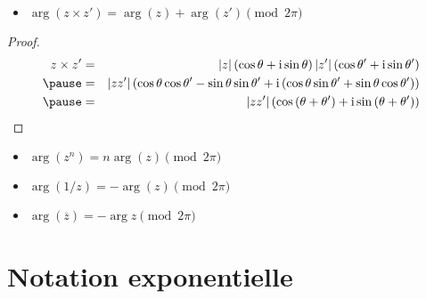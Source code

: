 \begin{frame}

  \begin{itemize}
    \item $\arg \left( z \times z' \right) = \arg (z) + \arg \left(
    z' \right) \pmod {2\pi}$
   \end{itemize}

\pause

\begin{proof}
  \begin{eqnarray*}
    z \times z' & = & \left| z \right|  \left( \cos \theta + \ii  \sin \theta \right) 
    \left| z' \right|  \left( \cos \theta' + \ii  \sin \theta' \right)\\
\pause
    & = & \left| zz' \right|  \left( \cos \theta \cos \theta' - \sin \theta
    \sin \theta' + \ii  \left( \cos \theta \sin \theta' + \sin \theta \cos
    \theta' \right) \right)\\
\pause
    & = & \left| zz' \right|  \left( \cos \left( \theta + \theta' \right) + \ii 
    \sin \left( \theta + \theta' \right) \right)
  \end{eqnarray*}
\end{proof}

     \begin{itemize}
\pause
    \item $\arg \left( z^n \right) = n \arg (z) \pmod {2\pi}$

\pause    
    \item $\arg \left( 1 / z \right) = - \arg (z) \pmod {2\pi}$

\pause    
    \item $\arg (\overline{z}) = - \arg z \pmod{2 \pi}$
  \end{itemize}



\end{frame}


\section{Notation exponentielle}

